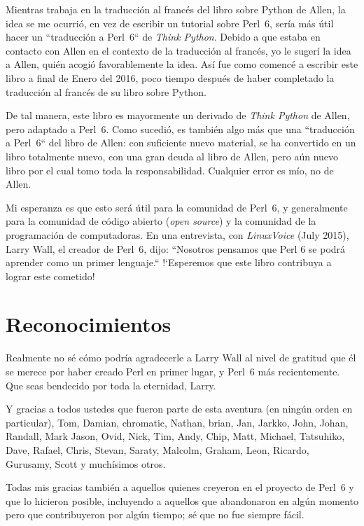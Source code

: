 Mientras trabaja en la traducción al francés del libro sobre Python
de Allen, la idea se me ocurrió, en vez de escribir un tutorial
sobre Perl~6, sería más útil hacer un ``traducción a Perl~6`` de 
\emph{Think Python}. Debido a que estaba en contacto con Allen en 
el contexto de la traducción al francés, yo le sugerí la idea a Allen, 
quién acogió favorablemente la idea. Así fue como comencé a escribir este 
libro a final de Enero del 2016, poco tiempo después de haber completado
la traducción al francés de su libro sobre Python.

De tal manera, este libro es mayormente un derivado de \emph{Think Python}
de Allen, pero adaptado a Perl~6. Como sucedió, es también algo más que 
una ``traducción a Perl~6`` del libro de Allen: con suficiente nuevo material,
se ha convertido en un libro totalmente nuevo, con una gran deuda al 
libro de Allen, pero aún nuevo libro por el cual tomo toda la responsabilidad.
Cualquier error es mío, no de Allen.

Mi esperanza es que esto será útil para la comunidad de Perl~6, y
generalmente para la comunidad de código abierto (\emph{open source})
y la comunidad de la programación de computadoras. En una entrevista,
con \emph{LinuxVoice} (July 2015), Larry Wall, el creador de Perl~6, dijo:
``Nosotros pensamos que Perl 6 se podrá aprender como un primer lenguaje.``
!`Esperemos que este libro contribuya a  lograr este cometido!


\section*{Reconocimientos}

Realmente no sé cómo podría agradecerle a Larry Wall al nivel de gratitud
que él se merece por haber creado Perl en primer lugar, y 
Perl~6 más recientemente. Que seas bendecido por toda la eternidad, Larry.

Y gracias a todos ustedes que fueron parte de esta aventura (en ningún orden en 
particular), Tom, Damian, 
chromatic, Nathan, brian, Jan, Jarkko, John, Johan, Randall, 
Mark Jason, Ovid, Nick, Tim, Andy, Chip, Matt, Michael, Tatsuhiko, 
Dave, Rafael, Chris, Stevan, Saraty, Malcolm, Graham, Leon, 
Ricardo, Gurusamy, Scott y muchísimos otros.

Todas mis gracias también a aquellos quienes creyeron
en el proyecto de Perl~6 y que lo hicieron posible, incluyendo
a aquellos que abandonaron en algún momento pero que contribuyeron
por algún tiempo; sé que no fue siempre fácil.

